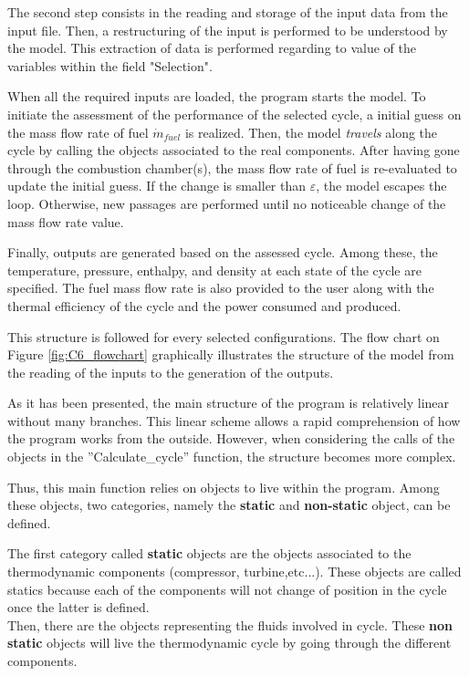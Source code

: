 The second step consists in the reading and storage of the input data from the input file. Then, a restructuring of the input is performed to be understood by the model. This extraction of data is performed regarding to value of the variables within the field "Selection".

When all the required inputs are loaded, the program starts the model. To initiate the assessment of the performance of the selected cycle, a initial guess on the mass flow rate of fuel $\dot{m}_{fuel}$ is realized. Then, the model \textit{travels} along the cycle by calling the objects associated to the real components. 
After having gone through the combustion chamber(s), the mass flow rate of fuel is re-evaluated to update the initial guess. If the change is smaller than $\varepsilon$, the model escapes the loop. Otherwise, new passages are performed until no noticeable change of the mass flow rate value.
   
Finally, outputs are generated based on the assessed cycle. Among these, the temperature, pressure, enthalpy, and density at each state of the cycle are specified. The fuel mass flow rate is also provided to the user along with the thermal efficiency of the cycle and the power consumed and produced. 

This structure is followed for every selected configurations. The flow chart on Figure \ref{fig:C6_flowchart} graphically illustrates the structure of the model from the reading of the inputs to the generation of the outputs.\clearpage

As it has been presented, the main structure of the program is relatively linear without many branches. This linear scheme allows a rapid comprehension of how the program works from the outside. However, when considering the calls of the objects in the ''Calculate\_cycle'' function, the structure becomes more complex. 

Thus, this main function relies on objects to live within the program.  Among these objects, two categories, namely the \textbf{static} and \textbf{non-static} object, can be defined.

The first category called \textbf{static} objects are the objects associated to the thermodynamic components (compressor, turbine,etc...). These objects are called statics because each of the components will not change of position in the cycle once the latter is defined. \\

Then, there are the objects representing the fluids involved in cycle. These \textbf{non static} objects will live the thermodynamic cycle by going through the different components.

